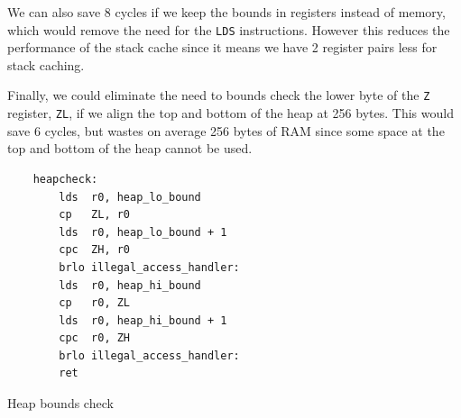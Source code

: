 We can also save 8 cycles if we keep the bounds in registers instead of memory, which would remove the need for the \texttt{LDS} instructions. However this reduces the performance of the stack cache since it means we have 2 register pairs less for stack caching.

Finally, we could eliminate the need to bounds check the lower byte of the \texttt{Z} register, \texttt{ZL}, if we align the top and bottom of the heap at 256 bytes. This would save 6 cycles, but wastes on average 256 bytes of RAM since some space at the top and bottom of the heap cannot be used.

\begin{listing}[H]
	\centering
 	\begin{verbatim}
    heapcheck:
        lds  r0, heap_lo_bound
        cp   ZL, r0
        lds  r0, heap_lo_bound + 1
        cpc  ZH, r0
        brlo illegal_access_handler:
        lds  r0, heap_hi_bound
        cp   r0, ZL
        lds  r0, heap_hi_bound + 1
        cpc  r0, ZH
        brlo illegal_access_handler:
        ret
	\end{verbatim}
	\caption{Heap bounds check}
	\label{lst-heap-bounds-check}
\end{listing}

